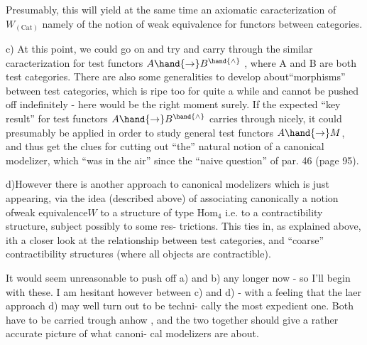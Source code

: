 
Presumably,  this will yield at the same time an axiomatic caracterization
of  $W_{(\mathrm{Cat})}$ namely of the notion of weak equivalence for functors between
categories.

c) At this point,  we could go on and try and carry through the similar
caracterization for test functors $A\hand{\to} B^{\hand{\wedge}}$ ,  where A and B are both test
categories.  There are also some generalities to develop about``morphisms''
between test categories,  which is ripe too for quite a while and cannot
be pushed off indefinitely  -  here would be the right moment surely.
If the expected ``key result'' for test functors $A\hand{\to} B^{\hand{\wedge}}$ carries through
nicely,  it could presumably be applied  in order to study general test
functors $A\hand{\to} M$,  and thus get the clues for cutting out ``the'' natural
notion of a canonical modelizer,  which ``was in the air'' since the ``naive
question'' of par. 46 (page 95).
 

d)However there is another approach to canonical modelizers which is
just appearing,  via the idea (described above) of associating canonically
a notion ofweak equivalence$W$ to a   structure  of type
$\mathrm{Hom}_4$ i.e. to a contractibility structure,  subject possibly to some res-%
trictions.  This ties in,  as explained above,  ith a closer look at
the relationship between test categories,  and ``coarse'' contractibility
structures (where all objects are contractible).

It would seem unreasonable to push off a) and b)  any longer now -
so I'll begin with these.  I am hesitant however between c) and d)  -
with a feeling that the laer approach d) may well turn out to be techni-%
cally the most expedient one.  Both have to be carried trough anhow ,
and the two together should give a rather accurate picture of what canoni-%
cal modelizers are about.

